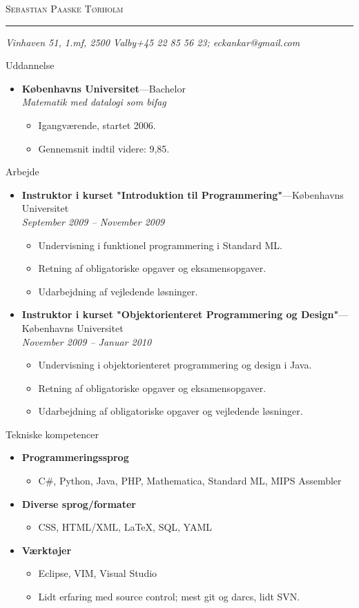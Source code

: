 \documentclass[11pt,oneside]{article}
\makeatletter
\newcommand{\name}{Sebastian Paaske Tørholm}
\newcommand{\addr}{Vinhaven 51, 1.mf, 2500 Valby}
\newcommand{\phone}{+45 22 85 56 23}
\newcommand{\email}{eckankar@gmail.com}
\newcommand{\bigname}[1]{
	\begin{center}\fontfamily{phv}\selectfont\Huge\scshape#1\end{center}
}
\newenvironment{ressection}[1]{
	\vspace{4pt}
	{\fontfamily{phv}\selectfont\Large#1}
	\begin{itemize}
	\vspace{3pt}
}{
	\end{itemize}
}
\newcommand{\resitem}[1]{
	\vspace{-4pt}
	\item \begin{flushleft} #1 \end{flushleft}
}
\newcommand{\ressubitem}[1]{
	\vspace{-1pt}
	\item \begin{flushleft} #1 \end{flushleft}
}
\newcommand{\resbigitem}[3]{
	\vspace{-5pt}
	\item
	\textbf{#1}---#2 \\
	\textit{#3}
}
\newenvironment{ressubsec}[3]{
	\resbigitem{#1}{#2}{#3}
	\vspace{-2pt}
	\begin{itemize}
}{
	\end{itemize}
}
\newenvironment{reslist}[1]{
	\resitem{\textbf{#1}}
	\vspace{-5pt}
	\begin{itemize}
}{
	\end{itemize}
}
\makeatother
\begin{document}
 \selectfont

\bigname{\name}

\vspace{-8pt} \rule{\textwidth}{1pt}

\vspace{-1pt} {\small\itshape \addr \hfill \phone; \email}

\vspace{8 pt}




\begin{ressection}{Uddannelse}

	\begin{ressubsec}{Københavns Universitet}{Bachelor}{Matematik med datalogi som bifag}
		\ressubitem{Igangværende, startet 2006.}
		\ressubitem{Gennemsnit indtil videre: 9,85.}
	\end{ressubsec}

\end{ressection}


\begin{ressection}{Arbejde}

	\begin{ressubsec}{Instruktor i kurset "Introduktion til Programmering"}{Københavns Universitet}{September 2009 -- November 2009}
		\ressubitem{Undervisning i funktionel programmering i Standard ML.}
		\ressubitem{Retning af obligatoriske opgaver og eksamensopgaver.}
		\ressubitem{Udarbejdning af vejledende løsninger.}
	\end{ressubsec}

	\begin{ressubsec}{Instruktor i kurset "Objektorienteret Programmering og Design"}{Københavns Universitet}{November 2009 -- Januar 2010}
		\ressubitem{Undervisning i objektorienteret programmering og design i Java.}
		\ressubitem{Retning af obligatoriske opgaver og eksamensopgaver.}
		\ressubitem{Udarbejdning af obligatoriske opgaver og vejledende løsninger.}
	\end{ressubsec}

\end{ressection}


\begin{ressection}{Tekniske kompetencer}
	\begin{reslist}{Programmeringssprog}
		\resitem{C\#, Python, Java, PHP, Mathematica, Standard ML, MIPS Assembler}
	\end{reslist}
	
	\begin{reslist}{Diverse sprog/formater}
		\resitem{CSS, HTML/XML, \LaTeX, SQL, YAML}
	\end{reslist}
	
	\begin{reslist}{Værktøjer}
		\resitem{Eclipse, VIM, Visual Studio}
		\resitem{Lidt erfaring med source control; mest git og darcs, lidt SVN.}
	\end{reslist}
\end{ressection}
\end{document}
